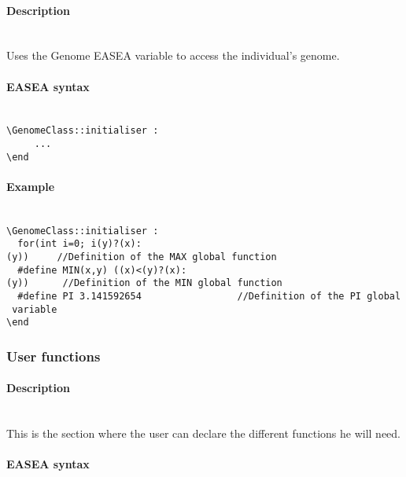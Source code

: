 \documentclass{book}
\begin{document}
\paragraph{Description}\label{description}
~\\
Uses the Genome EASEA variable
to access the individual's genome.

\paragraph{EASEA syntax}\label{easea-syntax}
~\\

\texttt{\textbackslash{}GenomeClass::initialiser~:}\\\texttt{~~~~~...}\\\texttt{\textbackslash{}end}

\paragraph{Example}\label{example}
~\\

\texttt{\textbackslash{}GenomeClass::initialiser~:}\\\texttt{~~for(int~i=0;~i}\texttt{(y)?(x):(y))~~~~~//Definition~of~the~MAX~global~function}\\\texttt{~~\#define~MIN(x,y)~((x)\textless{}(y)?(x):(y))~~~~~~//Definition~of~the~MIN~global~function}\\\texttt{~~\#define~PI~3.141592654~~~~~~~~~~~~~~~~~//Definition~of~the~PI~global~variable}\\\texttt{\textbackslash{}end}

\subsubsection{User functions}\label{user-functions}

\paragraph{Description}\label{description-1}
~\\

This is the section where the user can declare the different functions
he will need.

\paragraph{EASEA syntax}\label{easea-syntax-1}
~\\
\end{document}
